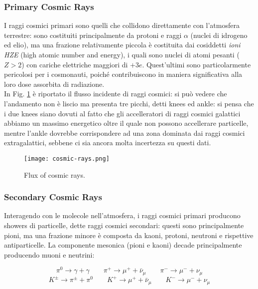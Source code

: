 \subsubsection{Primary Cosmic Rays}

I raggi cosmici primari sono quelli che collidono direttamente con l'atmosfera terrestre: sono costituiti principalmente da protoni e raggi $ \alpha $ (nuclei di idrogeno ed elio), ma una frazione relativamente piccola è costituita dai cosiddetti \textit{ioni HZE} (high atomic number and energy), i quali sono nuclei di atomi pesanti ($ Z > 2 $) con cariche elettriche maggiori di $ +3e $. Quest'ultimi sono particolarmente pericolosi per i cosmonauti, poiché contribuiscono in maniera significativa alla loro dose assorbita di radiazione.\\
In Fig. \ref{flux-cr} è riportato il flusso incidente di raggi cosmici: si può vedere che l'andamento non è liscio ma presenta tre picchi, detti knees ed ankle: si pensa che i due knees siano dovuti al fatto che gli accelleratori di raggi cosmici galattici abbiamo un massimo energetico oltre il quale non possono accellerare particelle, mentre l'ankle dovrebbe corrispondere ad una zona dominata dai raggi cosmici extragalattici, sebbene ci sia ancora molta incertezza su questi dati.

\begin{figure}
	\centering
	\texttt{[image: cosmic-rays.png]}
	\caption{Flux of cosmic rays.}
	\label{flux-cr}
\end{figure}

\subsubsection{Secondary Cosmic Rays}

Interagendo con le molecole nell'atmosfera, i raggi cosmici primari producono showers di particelle, dette raggi cosmici secondari: questi sono principalmente pioni, ma una frazione minore è composta da kaoni, protoni, neutroni e rispettive antiparticelle. La componente mesonica (pioni e kaoni) decade principalmente producendo muoni e neutrini:

\begin{equation*}
	\pi^0 \rightarrow \gamma + \gamma \qquad \pi^+ \rightarrow \mu^+ + \bar{\nu}_{\mu} \qquad \pi^- \rightarrow \mu^- + \nu_{\mu}
\end{equation*}
\begin{equation*}
	K^{\pm} \rightarrow \pi^{\pm} + \pi^0 \qquad K^+ \rightarrow \mu^+ + \bar{\nu}_{\mu} \qquad K^- \rightarrow \mu^- + \nu_{\mu}
\end{equation*}

